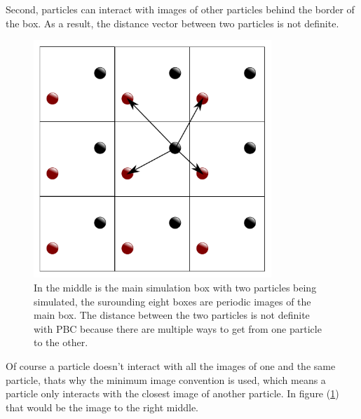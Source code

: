 Second, particles can interact with images of other particles behind the border of the box. As a result, the distance vector between two particles is not definite. 

\begin{figure}[h!]
\centering
\includegraphics[width=0.8\textwidth]{PBCinteraction.pdf}
\caption{In the middle is the main simulation box with two particles being simulated, the surounding eight boxes are periodic images of the main box. The distance between the two particles is not definite with PBC because there are multiple ways to get from one particle to the other.}
\label{PBCinteraction}
\end{figure}

Of course a particle doesn't interact with all the images of one and the same particle, thats why the minimum image convention is used, which means a particle only interacts with the closest image of another particle. In figure (\ref{PBCinteraction}) that would be the image to the right middle.





